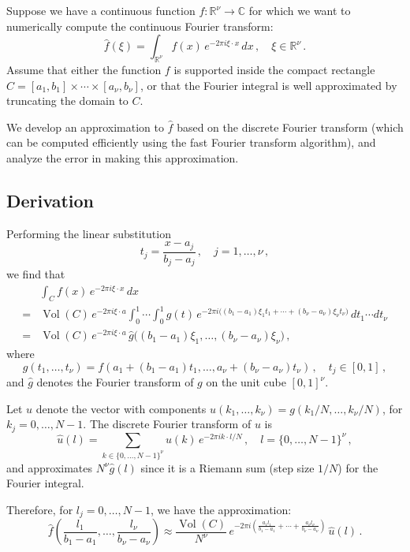 \documentclass[12pt]{article}
\newcommand{\complex}{\mathbb{C}}
\newcommand{\real}{\mathbb{R}}
\DeclareMathOperator{\Vol}{Vol}
\begin{document}

Suppose we have a continuous function $f \colon \real^\nu \to \complex$
for which we want to numerically 
compute the continuous Fourier transform:
\[
\hat{f}(\xi) = \int_{\real^\nu} f(x) \, e^{-2\pi i \xi \cdot x} \, dx\,, 
\quad \xi \in \real^\nu\,.
\]
Assume that either the function $f$ is supported
inside the compact rectangle
 $C = [a_1, b_1] \times \dotsb \times [a_\nu, b_\nu]$,
or that the Fourier integral is well approximated
by truncating the domain to $C$.

We develop an approximation to $\hat{f}$ 
based on the discrete Fourier transform
(which can be computed efficiently using the fast Fourier transform
algorithm), and analyze the error in making this approximation.

\subsection*{Derivation}

Performing the linear substitution
\[
t_j = \frac{x - a_j}{b_j - a_j}\,, \quad j = 1, \dotsc, \nu\,,
\]
we find that 
\begin{align*}
&\int_C f(x) \, e^{-2\pi i \xi \cdot x } \, dx\\
=& \Vol(C) \,  e^{-2\pi i \xi \cdot a}
\int_0^1 \dotsb \int_0^1
g(t) \,
e^{-2\pi i \bigl( (b_1 - a_1) \xi_1 t_1 + \dotsb + (b_\nu - a_\nu) \xi_\nu t_\nu \bigr)}\, dt_1 \dotsb dt_\nu \\
=& \Vol(C) \, e^{-2\pi i \xi \cdot a} \,
\hat{g}\bigl((b_1 - a_1)\xi_1, \dotsc, (b_\nu - a_\nu) \xi_\nu\bigr)\,,
\end{align*}
where
\[
g(t_1, \dotsc, t_\nu) = f(a_1 + (b_1 - a_1) t_1, \dotsc, a_\nu + (b_\nu - a_\nu) t_\nu)\,,
\quad
t_j \in [0, 1]\,,
\]
and $\hat{g}$ denotes the Fourier transform of $g$ on the unit cube $[0,1]^\nu$.

Let $u$ denote the vector with components
$u(k_1, \dotsc, k_\nu) = g(k_1/N, \dotsc, k_\nu/N)$, for $k_j = 0, \dotsc, N-1$.
The discrete Fourier transform
of $u$ is
\[
\hat{u}(l) = \sum_{k \in \{0, \dotsc, N-1\}^\nu} u(k) \, e^{-2\pi i k \cdot l/N}\,, \quad l = \{0, \dotsc, N-1\}^\nu\,,
\]
and approximates $N^\nu \hat{g}(l)$
since it is a Riemann sum (step size $1/N$) for the Fourier integral.

Therefore, for $l_j = 0, \dotsc, N-1$,
we have the approximation:
\[
\hat{f}\left( \frac{l_1}{b_1 - a_1}, \dotsc, \frac{l_\nu}{b_\nu - a_\nu} \right)
\approx \frac{\Vol(C)}{N^\nu} \, e^{-2\pi i \left( \frac{a_1 l_1}{b_1 - a_1} + \dotsb + \frac{a_\nu l_\nu}{b_\nu - a_\nu} \right)} \, \hat{u}(l)\,.
\]
\end{document}
